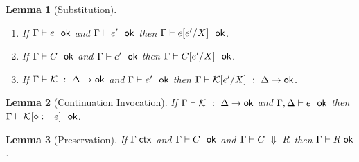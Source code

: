 \documentclass{article}
\newtheorem{lemma}{Lemma}
\newcommand{\C}{C}     %
\newcommand{\X}{X}     %
\newcommand{\R}{R}     %
\newcommand{\KK}{{\cal K}} %
\newcommand{\hole}{\diamond}
\newcommand{\evalto}[3][\G]{#1 \vdash #2 \ \Downarrow\  #3}
\newcommand{\resultok}[2][\G]{#1 \vdash #2 \ \mathsf{ok}}
\newcommand{\eok}[2][\G]{#1 \vdash #2 \ \ \mathsf{ok}}
\newcommand{\cok}[2][\G]{#1 \vdash #2 \ \ \mathsf{ok}}
\newcommand{\kok}[3][\G]{#1 \vdash #3 \ : \ #2\to\mathsf{ok}}
\begin{document}
\begin{lemma}[Substitution]
  \mbox{}
  \begin{enumerate}
    \item If $\eok{\e}$ and $\eok{\e'}$ then $\eok{\subst{\e}{\X}{\e'}}$.
    \item If $\cok{\C}$ and $\eok{\e'}$ then $\cok{\subst{\C}{\X}{\e'}}$.
    \item If $\kok{\D}{\KK}$ and $\eok{\e'}$ then $\kok{\D}{\subst{\KK}{\X}{\e'}}$.
  \end{enumerate}
\end{lemma}

\begin{lemma}[Continuation Invocation]
  If $\kok{\D}{\KK}$ and $\eok[\G,\D]{\e}$ then $\cok{\KK[\hole:=\e]}$.
\end{lemma}

\begin{lemma}[Preservation]
   If $\Gamma\;\mathsf{ctx}$ and $\cok{\C}$ and $\evalto{\C}{\R}$ then $\resultok{\R}$.
\end{lemma}
\end{document}
